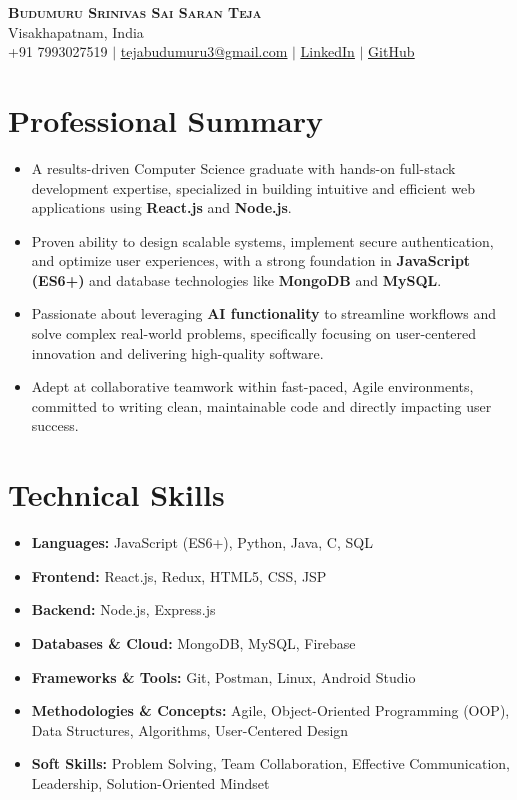 \documentclass[article,11pt]{article}
\newcommand{\resumeItem}[1]{\item\small{#1}}
\newcommand{\resumeSubHeadingListStart}{\begin{itemize}[leftmargin=0.15in, label={}]}
\newcommand{\resumeSubHeadingListEnd}{\end{itemize}}
\begin{document}
\begin{center}
    \textbf{\Huge \scshape Budumuru Srinivas Sai Saran Teja} \\ \vspace{1pt}
    Visakhapatnam, India \\
    \small +91 7993027519 $|$ \href{mailto:tejabudumuru3@gmail.com}{\underline{tejabudumuru3@gmail.com}} $|$
    \href{https://www.linkedin.com/in/saisaranteja}{\underline{LinkedIn}} $|$
    \href{https://github.com/saisaranteja}{\underline{GitHub}}
\end{center}

\section*{Professional Summary}
\begin{itemize}[leftmargin=0.15in, label={}]
\item A results-driven Computer Science graduate with hands-on full-stack development expertise, specialized in building intuitive and efficient web applications using \textbf{React.js} and \textbf{Node.js}.
\item Proven ability to design scalable systems, implement secure authentication, and optimize user experiences, with a strong foundation in \textbf{JavaScript (ES6+)} and database technologies like \textbf{MongoDB} and \textbf{MySQL}.
\item Passionate about leveraging \textbf{AI functionality} to streamline workflows and solve complex real-world problems, specifically focusing on user-centered innovation and delivering high-quality software.
\item Adept at collaborative teamwork within fast-paced, Agile environments, committed to writing clean, maintainable code and directly impacting user success.
\end{itemize}

\section{Technical Skills}
\resumeSubHeadingListStart
\resumeItem{\textbf{Languages:} JavaScript (ES6+), Python, Java, C, SQL}
\resumeItem{\textbf{Frontend:} React.js, Redux, HTML5, CSS, JSP}
\resumeItem{\textbf{Backend:} Node.js, Express.js}
\resumeItem{\textbf{Databases \& Cloud:} MongoDB, MySQL, Firebase}
\resumeItem{\textbf{Frameworks \& Tools:} Git, Postman, Linux, Android Studio}
\resumeItem{\textbf{Methodologies \& Concepts:} Agile, Object-Oriented Programming (OOP), Data Structures, Algorithms, User-Centered Design}
\resumeItem{\textbf{Soft Skills:} Problem Solving, Team Collaboration, Effective Communication, Leadership, Solution-Oriented Mindset}
\resumeSubHeadingListEnd
\end{document}

